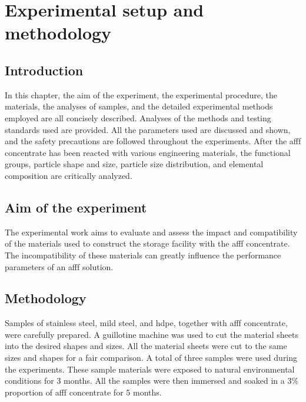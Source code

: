 \chapter{Experimental setup and methodology}
\label{ch4:anchor:chapter}

\section{Introduction}
In this chapter, the aim of the experiment, the experimental procedure, the materials, the analyses of samples, and the detailed experimental methods employed are all concisely described. Analyses of the methods and testing standards used are provided. All the parameters used are discussed and shown, and the safety precautions are followed throughout the experiments. After the \acrshort{afff} concentrate has been reacted with various engineering materials, the functional groups, particle shape and size, particle size distribution, and elemental composition are critically analyzed.

\section{Aim of the experiment}
The experimental work aims to evaluate and assess the impact and compatibility of the materials used to construct the storage facility with the \acrshort{afff} concentrate. The incompatibility of these materials can greatly influence the performance parameters of an \acrshort{afff} solution.  

\section{Methodology}
Samples of stainless steel, mild steel, and \acrshort{hdpe}, together with \acrshort{afff} concentrate, were carefully prepared. A guillotine machine was used to cut the material sheets into the desired shapes and sizes. All the material sheets were cut to the same sizes and shapes for a fair comparison. A total of three samples were used during the experiments. These sample materials were exposed to natural environmental conditions for 3 months. All the samples were then immersed and soaked in a 3\% proportion of \acrshort{afff} concentrate for 5 months.

